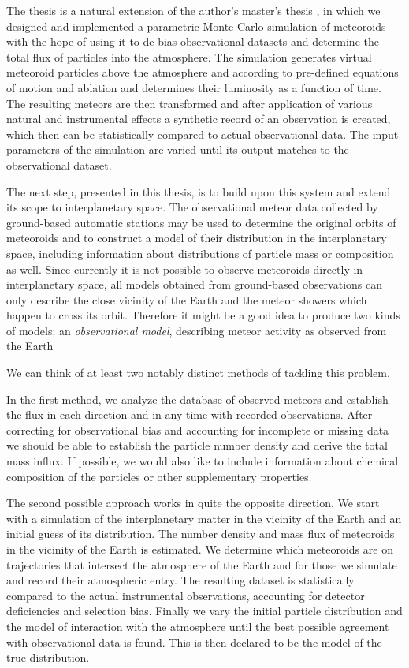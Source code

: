 The thesis is a natural extension of the author's master's thesis \citep{balaz-thesis},
in which we designed and implemented a parametric Monte-Carlo simulation of meteoroids
with the hope of using it to de-bias observational datasets and determine the total flux
of particles into the atmosphere.
The simulation generates virtual meteoroid particles above the atmosphere and
according to pre-defined equations of motion and ablation and determines their luminosity as a function of time.
The resulting meteors are then transformed and after application of various natural and
instrumental effects a synthetic record of an observation is created,
which then can be statistically compared to actual observational data.
The input parameters of the simulation are varied until its output matches to the observational dataset.

The next step, presented in this thesis, is to build upon this system and extend its scope to interplanetary space.
The observational meteor data collected by ground-based automatic stations may be used
to determine the original orbits of meteoroids and to construct a model
of their distribution in the interplanetary space, including information
about distributions of particle mass or composition as well.
Since currently it is not possible to observe meteoroids directly in interplanetary space,
all models obtained from ground-based observations can only describe the close
vicinity of the Earth and the meteor showers which happen to cross its orbit.
Therefore it might be a good idea to produce two kinds of models: an \emph{observational model},
describing meteor activity as observed from the Earth

We can think of at least two notably distinct methods of tackling this problem.

In the first method, we analyze the database of observed meteors and establish
the flux in each direction and in any time with recorded observations.
After correcting for observational bias and accounting for incomplete or missing
data we should be able to establish the particle
number density and derive the total mass influx.
If possible, we would also like to include information
about chemical composition of the particles or other supplementary properties.

The second possible approach works in quite the opposite direction. We start with a simulation
of the interplanetary matter in the vicinity of the Earth and an initial guess of its distribution.
The number density and mass flux of meteoroids in the vicinity of the Earth is estimated.
We determine which meteoroids are on trajectories that intersect the atmosphere of the Earth
and for those we simulate and record their atmospheric entry. The resulting dataset is statistically compared
to the actual instrumental observations, accounting for detector deficiencies and selection bias.
Finally we vary the initial particle distribution and the model of interaction with the atmosphere
until the best possible agreement with observational data is found.
This is then declared to be the model of the true distribution.

